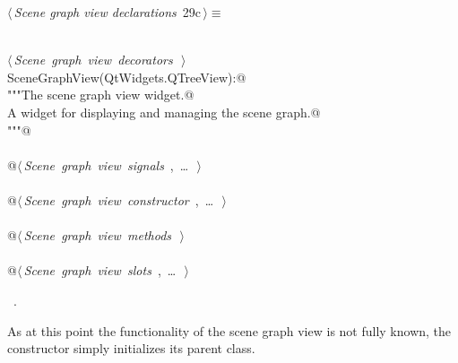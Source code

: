 \documentclass[
    a4paper,      %
    10pt,         %
    openright,    %
    notitlepage,  %
    parskip=half, %
]{scrreprt}       %
\theoremstyle{definition}                    %
\begin{document}
\begin{flushleft} \small
\begin{minipage}{\linewidth}\label{scrap31}\raggedright\small
{} $\langle\,${\itshape Scene graph view declarations}\nobreak\ {\footnotesize {29c}}$\,\rangle\equiv$
\vspace{-1ex}
\begin{list}{}{} \item
\mbox{}\lstinline@@\\
\mbox{}\lstinline@@\hbox{$\langle\,${\itshape Scene graph view decorators}\nobreak\ {\footnotesize {}}$\,\rangle$}\lstinline@@\\
\mbox{}\lstinline@class SceneGraphView(QtWidgets.QTreeView):@\\
\mbox{}\lstinline@    """The scene graph view widget.@\\
\mbox{}\lstinline@    A widget for displaying and managing the scene graph.@\\
\mbox{}\lstinline@    """@\\
\mbox{}\lstinline@@\\
\mbox{}\lstinline@    @\hbox{$\langle\,${\itshape Scene graph view signals}\nobreak\ {\footnotesize {}, \ldots\ }$\,\rangle$}\lstinline@@\\
\mbox{}\lstinline@@\\
\mbox{}\lstinline@    @\hbox{$\langle\,${\itshape Scene graph view constructor}\nobreak\ {\footnotesize {}, \ldots\ }$\,\rangle$}\lstinline@@\\
\mbox{}\lstinline@@\\
\mbox{}\lstinline@    @\hbox{$\langle\,${\itshape Scene graph view methods}\nobreak\ {\footnotesize {}}$\,\rangle$}\lstinline@@\\
\mbox{}\lstinline@@\\
\mbox{}\lstinline@    @\hbox{$\langle\,${\itshape Scene graph view slots}\nobreak\ {\footnotesize {}, \ldots\ }$\,\rangle$}\lstinline@@\\
\mbox{}\lstinline@@{\NWsep}
\end{list}
\vspace{-1.5ex}
\footnotesize
\begin{list}{}{\setlength{\itemsep}{-\parsep}\setlength{\itemindent}{-\leftmargin}}
\item \NWtxtMacroRefIn\ .

\item{}
\end{list}
\end{minipage}\vspace{4ex}
\end{flushleft}
As at this point the functionality of the scene graph view is not fully
known, the constructor simply initializes its parent class.
\end{document}
